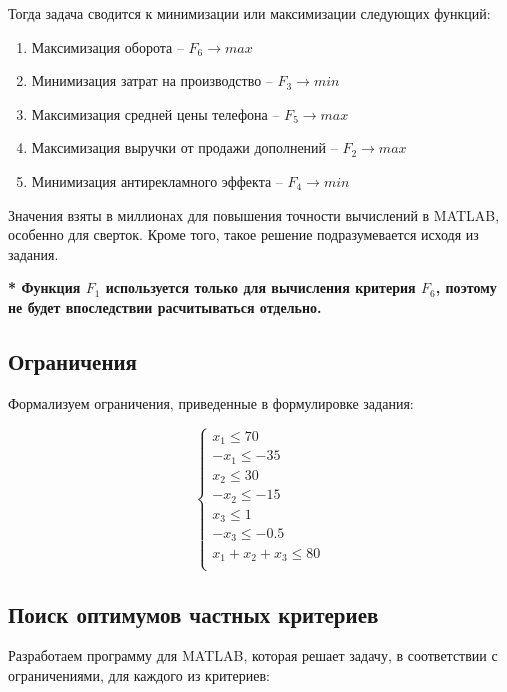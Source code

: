 \documentclass[14pt,a4paper,report]{report}
\begin{document}
Тогда задача сводится к минимизации или максимизации следующих функций:

\begin{enumerate}
	\item Максимизация оборота -- $F_6\rightarrow max$
	\item Минимизация затрат на производство -- $F_3\rightarrow min$
	\item Максимизация средней цены телефона -- $F_5\rightarrow max$
	\item Максимизация выручки от продажи дополнений -- $F_2\rightarrow max$
	\item Минимизация антирекламного эффекта -- $F_4\rightarrow min$
\end{enumerate}

Значения взяты в миллионах для повышения точности вычислений в MATLAB, особенно для сверток. Кроме того, такое решение подразумевается исходя из задания.

\textbf{* Функция $F_1$ используется только для вычисления критерия $F_6$, поэтому не будет впоследствии расчитываться отдельно.}

\subsection{Ограничения}

Формализуем ограничения, приведенные в формулировке задания:

\begin{equation*}
\begin{cases}
	\text{$x_1\leq 70$} \\
	\text{$-x_1\leq -35$} \\
	\text{$x_2\leq 30$} \\
	\text{$-x_2\leq -15$} \\
	\text{$x_3\leq 1$} \\
	\text{$-x_3\leq -0.5$} \\
	\text{$x_1+x_2+x_3\leq 80$} \\
\end{cases}
\end{equation*}

\subsection{Поиск оптимумов частных критериев}

Разработаем программу для MATLAB, которая решает задачу, в соответствии с ограничениями, для каждого из критериев:
\end{document}
